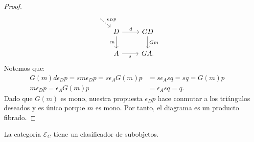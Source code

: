 \begin{proof}
\begin{equation*}
\begin{tikzcd}
          \ar[dashed]{rd}{\epsilon_Dp}\\[-2ex]
      & [-2ex] D\ar{r}{d}\ar[swap]{d}{m} & GD\ar{d}{Gm} \\
      & A\ar[swap]{r}{s} & GA.
    \end{tikzcd}
  \end{equation*}
  Notemos que:
  \begin{align*}
    G(m)d\epsilon_Dp = sm\epsilon_Dp = s\epsilon_AG(m)p &= s\epsilon_Asq = sq = G(m)p \\
    m\epsilon_Dp = \epsilon_AG(m)p &= \epsilon_Asq = q.
  \end{align*}
  Dado que $G(m)$ es mono, nuestra propuesta $\epsilon_Dp$ hace conmutar a los triángulos deseados
  y es único porque $m$ es mono. Por tanto, el diagrama es un producto fibrado.
\end{proof}
\begin{lemma}
  La categoría $\mathcal{E}_C$ tiene un clasificador de subobjetos.
\end{lemma}
